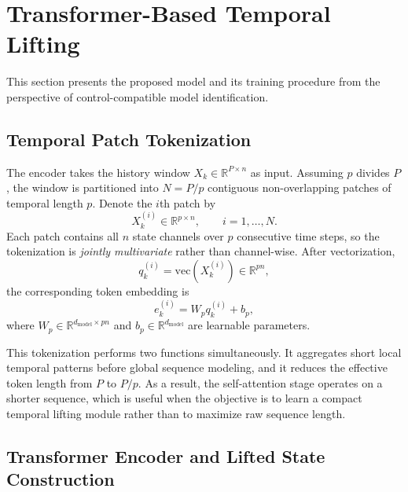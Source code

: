 \documentclass[journal]{IEEEtran}
\begin{document}
\section{Transformer-Based Temporal Lifting}
\label{sec:methodology}

This section presents the proposed model and its training procedure from the perspective of control-compatible model identification.

\subsection{Temporal Patch Tokenization}

The encoder takes the history window $X_k \in \mathbb{R}^{P\times n}$ as input. Assuming $p$ divides $P$, the window is partitioned into $N=P/p$ contiguous non-overlapping patches of temporal length $p$. Denote the $i$th patch by
\begin{equation}
    X_k^{(i)} \in \mathbb{R}^{p\times n}, \qquad i=1,\ldots,N.
\end{equation}
Each patch contains all $n$ state channels over $p$ consecutive time steps, so the tokenization is \emph{jointly multivariate} rather than channel-wise. After vectorization,
\begin{equation}
    q_k^{(i)} = \mathrm{vec}(X_k^{(i)}) \in \mathbb{R}^{pn},
\end{equation}
the corresponding token embedding is
\begin{equation}
    e_k^{(i)} = W_p q_k^{(i)} + b_p,
    \label{eq:patch_embedding}
\end{equation}
where $W_p \in \mathbb{R}^{d_{\mathrm{model}}\times pn}$ and $b_p \in \mathbb{R}^{d_{\mathrm{model}}}$ are learnable parameters.

This tokenization performs two functions simultaneously. It aggregates short local temporal patterns before global sequence modeling, and it reduces the effective token length from $P$ to $P/p$. As a result, the self-attention stage operates on a shorter sequence, which is useful when the objective is to learn a compact temporal lifting module rather than to maximize raw sequence length.

\subsection{Transformer Encoder and Lifted State Construction}
\end{document}
